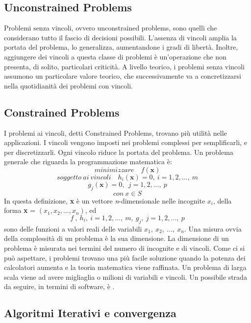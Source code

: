 \documentclass{article}
\begin{document}
\subsection{Unconstrained Problems}
Problemi senza vincoli, ovvero unconstrained problems, sono quelli che considerano tutto il fascio 
di decisioni possibili. L'assenza di vincoli amplia la portata del problema, lo generalizza, aumentandone
i gradi di libertà. Inoltre, aggiungere dei vincoli a questa classe di problemi è un'operazione 
che non presenta, di solito, particolari criticità. A livello teorico, i problemi senza vincoli
assumono un particolare valore teorico, che successivamente va a concretizzarsi nella quotidianità
dei problemi con vincoli.

\subsection{Constrained Problems}
I problemi ai vincoli, detti Constrained Problems, trovano più utilità nelle applicazioni. I vincoli
vengono imposti nei problemi complessi per semplificarli, e per discretizzarli. Ogni vincolo 
riduce la portata del problema. Un problema generale che riguarda la programmazione matematica è: 
\[minimizzare \quad  f(\textbf{x}) \] 
\[soggetto \ ai \ vincoli \quad h_i(\textbf{x})=0, \ i= 1,2, ..., \ m \] \[g_j(\textbf{x})=0,\ \ j= 1,2, ..., \ p  \] 
\[con \  x \in \textit{S}\] 
In questa definizione, \textbf{x} è un vettore \textit{n}-dimensionale nelle incognite \(x_i\),
della forma \textbf{x} = \( (x_1, x_2, ..., x_n) \), ed \[ \textit{f} \ , \ \textit{\(h_i\)},  \ i= 1,2, ...,\ m,  
\ \textit{\(g_j\)}, \ j= 1,2, ..., \ p \] sono delle funzioni a valori reali delle variabili 
\(x_1, \ x_2, \ ..., \ x_n\).
Una misura ovvia della complessità di un problema è la sua dimensione. 
La dimensione di un problema è misurata nei termini del numero di incognite e
di vincoli. Come ci si può aspettare, i problemi trovano una più facile soluzione
quando la potenza dei calcolatori aumenta e la teoria matematica viene raffinata.
Un problema di larga scala viene ad avere migliaglia o milioni di variabili e vincoli.
Un possibile strada da seguire, in termini di software, è \textcite{Gecode}.

\subsection{Algoritmi Iterativi e convergenza}
\end{document}
